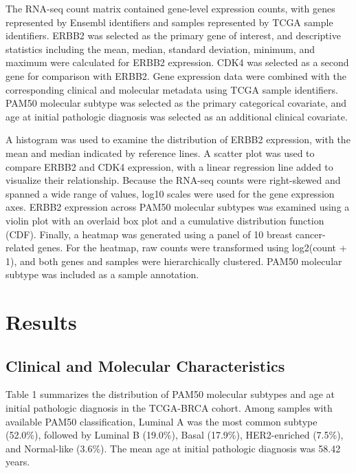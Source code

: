 \documentclass{article}
\begin{document}
The RNA-seq count matrix contained gene-level expression counts, with
genes represented by Ensembl identifiers and samples represented by
TCGA sample identifiers. ERBB2 was selected as the primary gene of
interest, and descriptive statistics including the mean, median,
standard deviation, minimum, and maximum were calculated for ERBB2
expression. CDK4 was selected as a second gene for comparison with
ERBB2. Gene expression data were combined with the corresponding
clinical and molecular metadata using TCGA sample identifiers.
PAM50 molecular subtype was selected as the primary categorical
covariate, and age at initial pathologic diagnosis was selected as
an additional clinical covariate.

A histogram was used to examine the distribution of ERBB2 expression,
with the mean and median indicated by reference lines. A scatter plot
was used to compare ERBB2 and CDK4 expression, with a linear regression
line added to visualize their relationship. Because the RNA-seq counts
were right-skewed and spanned a wide range of values, log10 scales were
used for the gene expression axes. ERBB2 expression across PAM50
molecular subtypes was examined using a violin plot with an overlaid
box plot and a cumulative distribution function (CDF). Finally, a
heatmap was generated using a panel of 10 breast cancer-related genes.
For the heatmap, raw counts were transformed using log2(count + 1),
and both genes and samples were hierarchically clustered. PAM50
molecular subtype was included as a sample annotation.

\section{Results}

\subsection{Clinical and Molecular Characteristics}

Table 1 summarizes the distribution of PAM50 molecular subtypes and
age at initial pathologic diagnosis in the TCGA-BRCA cohort. Among
samples with available PAM50 classification, Luminal A was the most
common subtype (52.0\%), followed by Luminal B (19.0\%), Basal
(17.9\%), HER2-enriched (7.5\%), and Normal-like (3.6\%). The mean
age at initial pathologic diagnosis was 58.42 years.
\end{document}
